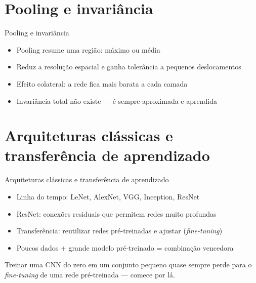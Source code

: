 \documentclass[aspectratio=169, 11pt]{beamer}
\begin{document}
\section{Pooling e invariância}

\begin{frame}{Pooling e invariância}
  \begin{itemize}\setlength{\itemsep}{0.4ex}
    \item Pooling resume uma região: máximo ou média
    \item Reduz a resolução espacial e ganha tolerância a pequenos deslocamentos
    \item Efeito colateral: a rede fica mais barata a cada camada
    \item Invariância total não existe — é sempre aproximada e aprendida
  \end{itemize}
\end{frame}

\section{Arquiteturas clássicas e transferência de aprendizado}

\begin{frame}{Arquiteturas clássicas e transferência de aprendizado}
  \begin{itemize}\setlength{\itemsep}{0.4ex}
    \item Linha do tempo: LeNet, AlexNet, VGG, Inception, ResNet
    \item ResNet: conexões residuais que permitem redes muito profundas
    \item Transferência: reutilizar redes pré-treinadas e ajustar
          (\emph{fine-tuning})
    \item Poucos dados + grande modelo pré-treinado = combinação vencedora
  \end{itemize}
  \begin{alertabox}
    Treinar uma CNN do zero em um conjunto pequeno quase sempre perde para
    o \emph{fine-tuning} de uma rede pré-treinada — comece por lá.
  \end{alertabox}
\end{frame}
\end{document}

